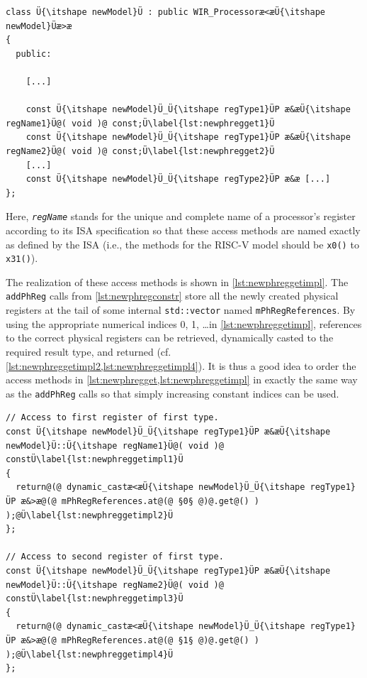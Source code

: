 \begin{enumerate}[resume]
\begin{lstlisting}[style=code,float=!b,caption={Declaration of Access Methods for Physical Registers},label=lst:newphregget]
class Ü{\itshape newModel}Ü : public WIR_Processoræ<æÜ{\itshape newModel}Üæ>æ
{
  public:

    [...]

    const Ü{\itshape newModel}Ü_Ü{\itshape regType1}ÜP æ&æÜ{\itshape regName1}Ü@( void )@ const;Ü\label{lst:newphregget1}Ü
    const Ü{\itshape newModel}Ü_Ü{\itshape regType1}ÜP æ&æÜ{\itshape regName2}Ü@( void )@ const;Ü\label{lst:newphregget2}Ü
    [...]
    const Ü{\itshape newModel}Ü_Ü{\itshape regType2}ÜP æ&æ [...]
};
\end{lstlisting}
  Here, \texttt{\itshape regName} stands for the unique and complete name of a processor's register according to its \gls{ISA} specification so that these access methods are named exactly as defined by the \gls{ISA} (i.e., the methods for the RISC-V model should be \texttt{x0()} to \texttt{x31()}).

  The realization of these access methods is shown in \cref{lst:newphreggetimpl}.
  The \texttt{addPhReg} calls from \cref{lst:newphregconstr} store all the newly created physical registers at the tail of some internal \texttt{std::vector} named \texttt{mPhReg\-References}.
  By using the appropriate numerical indices 0, 1, \dots in \cref{lst:newphreggetimpl}, references to the correct physical registers can be retrieved, dynamically casted to the required result type, and returned (cf. \cref{lst:newphreggetimpl2,lst:newphreggetimpl4}).
  It is thus a good idea to order the access methods in \cref{lst:newphregget,lst:newphreggetimpl} in exactly the same way as the \texttt{addPhReg} calls so that simply increasing constant indices can be used.

\begin{lstlisting}[style=code,float=!t,caption={Implementation of Access Methods for Physical Registers},label=lst:newphreggetimpl]
// Access to first register of first type.
const Ü{\itshape newModel}Ü_Ü{\itshape regType1}ÜP æ&æÜ{\itshape newModel}Ü::Ü{\itshape regName1}Ü@( void )@ constÜ\label{lst:newphreggetimpl1}Ü
{
  return@(@ dynamic_castæ<æÜ{\itshape newModel}Ü_Ü{\itshape regType1}ÜP æ&>æ@(@ mPhRegReferences.at@(@ §0§ @)@.get@() ) );@Ü\label{lst:newphreggetimpl2}Ü
};

// Access to second register of first type.
const Ü{\itshape newModel}Ü_Ü{\itshape regType1}ÜP æ&æÜ{\itshape newModel}Ü::Ü{\itshape regName2}Ü@( void )@ constÜ\label{lst:newphreggetimpl3}Ü
{
  return@(@ dynamic_castæ<æÜ{\itshape newModel}Ü_Ü{\itshape regType1}ÜP æ&>æ@(@ mPhRegReferences.at@(@ §1§ @)@.get@() ) );@Ü\label{lst:newphreggetimpl4}Ü
};


\end{lstlisting}
\end{enumerate}
